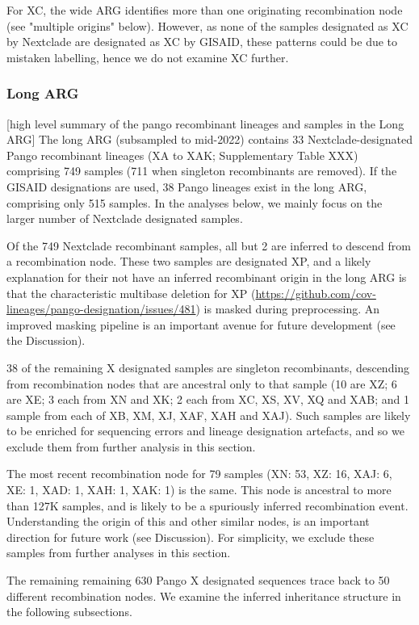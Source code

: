 \documentclass{article}
\begin{document}
For XC, the wide ARG identifies more than one originating recombination node (see "multiple origins" below). However, as none of the samples designated as XC by Nextclade are designated as XC by GISAID, these patterns could be due to mistaken labelling, hence we do not examine XC further.

\subsubsection{Long ARG}
[high level summary of the pango recombinant lineages and samples in the Long ARG]
The long ARG (subsampled to mid-2022) contains 33 Nextclade-designated Pango recombinant lineages (XA to XAK; Supplementary Table XXX) comprising 749 samples (711 when singleton recombinants are removed). If the GISAID designations are used, 38 Pango lineages exist in the long ARG, comprising only 515 samples. In the analyses below, we mainly focus on the larger number of Nextclade designated samples.

Of the 749 Nextclade recombinant samples, all but 2 are inferred to descend from a recombination node. These two samples are designated XP, and a likely explanation for their not have an inferred recombinant origin in the long ARG is that the characteristic multibase deletion for XP (\url{https://github.com/cov-lineages/pango-designation/issues/481}) is masked during preprocessing. An improved masking pipeline is an important avenue for future development (see the Discussion).

38 of the remaining X designated samples are singleton recombinants, descending from recombination nodes that are ancestral only to that sample (10 are XZ; 6 are XE;  3 each from XN and XK; 2 each from XC, XS, XV, XQ and XAB; and 1 sample from each of XB, XM, XJ, XAF, XAH and XAJ). Such samples are likely to be enriched for sequencing errors and lineage designation artefacts, and so we exclude them from further analysis in this section.

The most recent recombination node for 79 samples (XN: 53, XZ: 16, XAJ: 6, XE: 1, XAD: 1, XAH: 1, XAK: 1) is the same. This node is ancestral to more than 127K samples, and is likely to be a spuriously inferred recombination event. Understanding the origin of this and other similar nodes, is an important direction for future work (see Discussion). For simplicity, we exclude these samples from further analyses in this section.

The remaining remaining 630 Pango X designated sequences trace back to 50 different recombination nodes. We examine the inferred inheritance structure in the following subsections.
\end{document}
